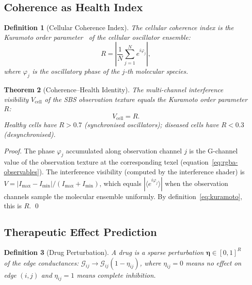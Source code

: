\documentclass[11pt,twocolumn,a4paper]{article}
\newtheorem{theorem}{Theorem}[section]
\newtheorem{definition}[theorem]{Definition}
\newcommand{\Gcond}{\mathcal{G}}
\begin{document}
\subsection{Coherence as Health Index}

\begin{definition}[Cellular Coherence Index]
\label{def:coherence}
The \emph{cellular coherence index} is the Kuramoto order
parameter~\citep{kuramoto1975,strogatz2000,acebron2005} of the
cellular oscillator ensemble:
\begin{equation}
  R = \left| \frac{1}{N} \sum_{j=1}^{N} e^{i\varphi_j} \right|,
  \label{eq:kuramoto}
\end{equation}
where $\varphi_j$ is the oscillatory phase of the $j$-th molecular
species.
\end{definition}

\begin{theorem}[Coherence--Health Identity]
\label{thm:coherence-health}
The multi-channel interference visibility $V_{\mathrm{cell}}$ of the
SBS observation texture equals the Kuramoto order parameter $R$:
\begin{equation}
  V_{\mathrm{cell}} = R.
  \label{eq:coherence-health}
\end{equation}
Healthy cells have $R > 0.7$ (synchronised oscillators); diseased
cells have $R < 0.3$ (desynchronised).
\end{theorem}

\begin{proof}
The phase $\varphi_j$ accumulated along observation channel $j$ is
the G-channel value of the observation texture at the corresponding
texel (equation~\ref{eq:rgba-observables}).  The interference
visibility (computed by the interference shader) is
$V = |I_{\max} - I_{\min}| / (I_{\max} + I_{\min})$, which equals
$|\langle e^{i\varphi_j} \rangle|$ when the observation channels
sample the molecular ensemble uniformly.  By
definition~\eqref{eq:kuramoto}, this is $R$.  \qed
\end{proof}

\subsection{Therapeutic Effect Prediction}

\begin{definition}[Drug Perturbation]
\label{def:drug}
A drug is a sparse perturbation $\boldsymbol{\eta} \in [0,1]^R$ of
the edge conductances: $\Gcond_{ij} \to \Gcond_{ij}(1 - \eta_{ij})$,
where $\eta_{ij} = 0$ means no effect on edge $(i,j)$ and
$\eta_{ij} = 1$ means complete inhibition.
\end{definition}
\end{document}
